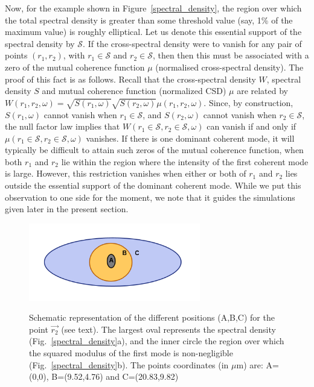 \documentclass{iucr}              %
\begin{document}
Now, for the example shown in Figure~\ref{spectral_density}, the region over which the total spectral density is greater than some threshold value (say, 1\% of the maximum value) is roughly elliptical.  Let us denote this essential support of the spectral density by $\mathcal{S}$.  If the cross-spectral density were to vanish for any pair of points $(r_1,r_2)$, with $r_1 \in \mathcal{S}$ and $r_2 \in \mathcal{S}$, then then this must be associated with a zero of the mutual coherence function $\mu$ (normalised cross-spectral density).  The proof of this fact \cite{GburSPIE} is as follows.  Recall that the cross-spectral density $W$, spectral density $S$ and mutual coherence function (normalized CSD) $\mu$ are related by $W(r_1,r_2,\omega)=\sqrt{S(r_1,\omega)}\sqrt{S(r_2,\omega)}\mu(r_1,r_2,\omega)$.  Since, by construction, $S(r_1,\omega)$ cannot vanish when $r_1 \in \mathcal{S}$, and $S(r_2,\omega)$ cannot vanish when $r_2 \in \mathcal{S}$, the null factor law implies that $W(r_1\in \mathcal{S},r_2\in \mathcal{S},\omega)$ can vanish if and only if $\mu(r_1\in \mathcal{S},r_2\in \mathcal{S},\omega)$ vanishes.  If there is one dominant coherent mode, it will typically be difficult to attain such zeros of the mutual coherence function, when both $r_1$ and $r_2$ lie within the region where the intensity of the first coherent mode is large.  However, this restriction vanishes when either or both of $r_1$ and $r_2$ lies outside the essential support of the dominant coherent mode.  While we put this observation to one side for the moment, we note that it guides the simulations given later in the present section.        

\begin{figure}
\caption{Schematic representation of the different positions (A,B,C) for the point $\vec{r_2}$ (see text). The largest oval represents the spectral density (Fig.~\ref{spectral_density}a), and the inner circle the region over which the squared modulus of the first mode is non-negligible (Fig.~\ref{spectral_density}b).
The points coordinates (in $\mu$m) are: A=(0,0), B=(9.52,4.76) and C=(20.83,9.82)}
\includegraphics[width=7.5cm]{Figures/eye.png}
\label{eye}
\end{figure}
\end{document}
